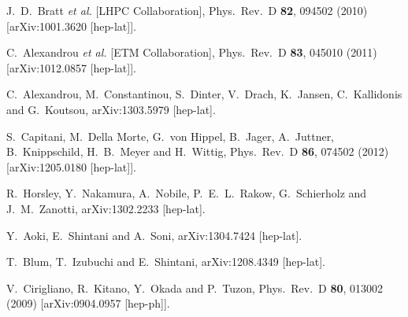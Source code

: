 \begin{thebibliography}{99}
  J.~D.~Bratt {\it et al.}  [LHPC Collaboration],
  Phys.\ Rev.\ D {\bf 82}, 094502 (2010)
  [arXiv:1001.3620 [hep-lat]].

  C.~Alexandrou {\it et al.}  [ETM Collaboration],
  Phys.\ Rev.\ D {\bf 83}, 045010 (2011)
  [arXiv:1012.0857 [hep-lat]].

  C.~Alexandrou, M.~Constantinou, S.~Dinter, V.~Drach, K.~Jansen, C.~Kallidonis and G.~Koutsou,
  arXiv:1303.5979 [hep-lat].
  
  S.~Capitani, M.~Della Morte, G.~von Hippel, B.~Jager, A.~Juttner, B.~Knippschild, H.~B.~Meyer and H.~Wittig,
  Phys.\ Rev.\ D {\bf 86}, 074502 (2012)
  [arXiv:1205.0180 [hep-lat]].

  R.~Horsley, Y.~Nakamura, A.~Nobile, P.~E.~L.~Rakow, G.~Schierholz and J.~M.~Zanotti,
  arXiv:1302.2233 [hep-lat].
 
  Y.~Aoki, E.~Shintani and A.~Soni,
  arXiv:1304.7424 [hep-lat].

  T.~Blum, T.~Izubuchi and E.~Shintani,
  arXiv:1208.4349 [hep-lat].
  
  V.~Cirigliano, R.~Kitano, Y.~Okada and P.~Tuzon,
  Phys.\ Rev.\ D {\bf 80}, 013002 (2009)
  [arXiv:0904.0957 [hep-ph]].


\end{thebibliography}
